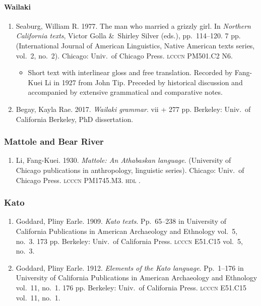 \documentclass[12pt,letterpaper,oneside,article]{memoir}
\begin{document}
\paragraph{Wailaki}\label{sec:wailaki}

\begin{enumerate}
\item	Seaburg, William R.
	1977.
	The man who married a grizzly girl.
	In \textit{Northern California texts}, Victor Golla \&\ Shirley Silver (eds.),
	pp.\ 114–120.
	7 pp.
	(International Journal of American Linguistics, Native American texts series, vol.\ 2,
		no.\ 2).
	Chicago: Univ.\ of Chicago Press.
	\textsc{lcccn} PM501.C2 N6.
	\begin{itemize}
	\item	Short text with interlinear gloss and free translation.
		Recorded by Fang-Kuei Li in 1927 from John Tip.
		Preceded by historical discussion and accompanied by extensive grammatical
		and comparative notes.
	\end{itemize}
\item	Begay, Kayla Rae.
	2017.
	\textit{Wailaki grammar}.
	vii + 277 pp.
	Berkeley: Univ.\ of California Berkeley, PhD dissertation.
\end{enumerate}

\subsubsection{Mattole and Bear River}\label{sec:mattole}

\begin{enumerate}
\item	Li, Fang-Kuei.
	1930.
	\textit{Mattole: An Athabaskan language}.
	(University of Chicago publications in anthropology, linguistic series).
	Chicago: Univ.\ of Chicago Press.
	\textsc{lcccn} PM1745.M3.
	\textsc{hdl} .
\end{enumerate}

\subsubsection{Kato}\label{sec:kato}

\begin{enumerate}
\item	Goddard, Pliny Earle.
	1909.
	\textit{Kato texts}.
	Pp.\ 65–238 in University of California Publications in American Archaeology
		and Ethnology vol.\ 5, no.\ 3.
	173 pp.
	Berkeley: Univ.\ of California Press.
	\textsc{lcccn} E51.C15 vol.\ 5, no.\ 3.
\item	Goddard, Pliny Earle.
	1912.
	\textit{Elements of the Kato language}.
	Pp.\ 1–176 in University of California Publications in American Archaeology
		and Ethnology vol.\ 11, no.\ 1.
	176 pp.
	Berkeley: Univ.\ of California Press.
	\textsc{lcccn} E51.C15 vol.\ 11, no.\ 1.
\end{enumerate}
\end{document}
